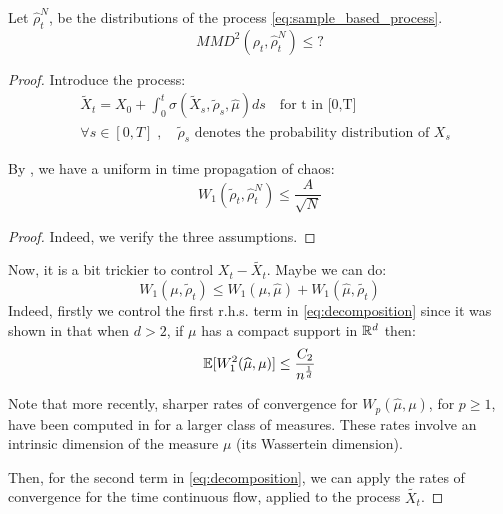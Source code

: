 

\begin{proposition} Let $\widehat{\rho}_t^N$, be the distributions of the process \eqref{eq:sample_based_process}. %
	\begin{equation}
	MMD^2(\rho_t,\widehat{\rho}_t^N)\le ?%
	\end{equation}
\end{proposition}
\begin{proof} 
	Introduce the process:
	\begin{align}\label{eq:intermediary_process}
	&\widetilde{X}_t=X_{0}+\int_{0}^t \sigma(\widetilde{X}_s, \widetilde{\rho}_s, \widehat{\mu})ds \quad \text{for t in [0,T]}\\
	&\forall s \in [0,T]\;,\quad \widetilde{\rho}_s \text{ denotes the probability distribution of } X_s
	\end{align}
	\begin{lemma}
		By \cite{durmus2018elementary}, we have a uniform in time propagation of chaos:
		\begin{equation}
		W_1(\widetilde{\rho}_t,\widehat{\rho}_t^N)\le \frac{A}{\sqrt{N}}
		\end{equation}
	\end{lemma}
\begin{proof}
	Indeed, we verify the three assumptions. 
\end{proof}
	Now, it is a bit trickier to control $X_t-\widetilde{X_t}$. Maybe we can do:
	\begin{equation}\label{eq:decomposition}
	W_1(\mu, \widetilde{\rho}_t)\le W_1(\mu, \widehat{\mu})+W_1(\widehat{\mu}, \widetilde{\rho_t})
	\end{equation}
	Indeed, firstly we control the first r.h.s. term in \eqref{eq:decomposition} since it was shown in \cite{dudley1969speed} that when $d > 2$, if $\mu$ has a compact support in ${{\mathbb R}}^d$ then:
	\begin{equation}
	{{\mathbb E}}[W_1^2(\widehat{\mu},\mu)]\le \frac{C_2}{n^{\frac{1}{d}}}
	\end{equation}
	\begin{remark}
		Note that more recently, sharper rates of convergence  for $W_p(\widehat{ \mu}, \mu)$, for $p\ge 1$, have been computed in \cite{weed2017sharp} for a larger class of measures. These rates involve an intrinsic dimension of the measure $\mu$ (its Wassertein dimension). 
	\end{remark}
	Then, for the second term in \eqref{eq:decomposition}, we can apply the rates of convergence for the time continuous flow, applied to the process $\widetilde{X_t}$.
\end{proof}